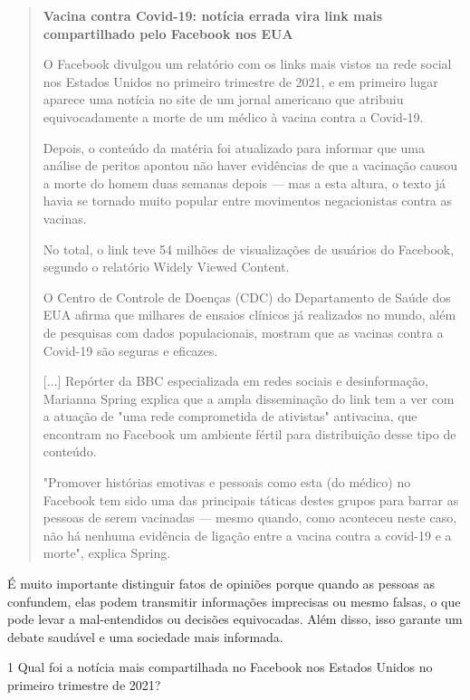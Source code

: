\begin{quote}
\textbf{Vacina contra Covid-19: notícia errada vira link mais
compartilhado pelo Facebook nos EUA}

O Facebook divulgou um relatório com os links mais vistos na rede social
nos Estados Unidos no primeiro trimestre de 2021, e em primeiro lugar
aparece uma notícia no site de um jornal americano que atribuiu
equivocadamente a morte de um médico à vacina contra a Covid-19.

Depois, o conteúdo da matéria foi atualizado para informar que uma
análise de peritos apontou não haver evidências de que a vacinação
causou a morte do homem duas semanas depois --- mas a esta altura, o
texto já havia se tornado muito popular entre movimentos negacionistas
contra as vacinas.

No total, o link teve 54 milhões de visualizações de usuários do
Facebook, segundo o relatório Widely Viewed Content.

O Centro de Controle de Doenças (CDC) do Departamento de Saúde dos EUA
afirma que milhares de ensaios clínicos já realizados no mundo, além de
pesquisas com dados populacionais, mostram que as vacinas contra a
Covid-19 são seguras e eficazes.

{[}...{]} Repórter da BBC especializada em redes sociais e
desinformação, Marianna Spring explica que a ampla disseminação do link
tem a ver com a atuação de "uma rede comprometida de ativistas"
antivacina, que encontram no Facebook um ambiente fértil para
distribuição desse tipo de conteúdo.

"Promover histórias emotivas e pessoais como esta (do médico) no
Facebook tem sido uma das principais táticas destes grupos para barrar
as pessoas de serem vacinadas --- mesmo quando, como aconteceu neste
caso, não há nenhuma evidência de ligação entre a vacina contra a
covid-19 e a morte", explica Spring.

\end{quote}

É muito importante distinguir fatos de opiniões porque quando as pessoas
as confundem, elas podem transmitir informações imprecisas ou mesmo
falsas, o que pode levar a mal-entendidos ou decisões equivocadas. Além
disso, isso garante um debate saudável e uma sociedade mais informada.


\num{1} Qual foi a notícia mais compartilhada no Facebook nos Estados
Unidos no primeiro trimestre de 2021?

